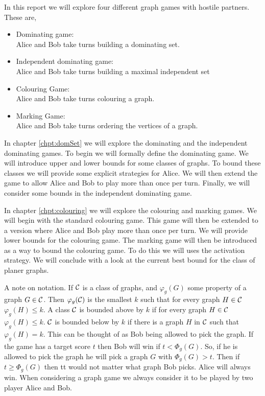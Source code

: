 In this report %
we will explore four different graph games with hostile partners. These are,
\begin{itemize}
    \item Dominating game: \\
        Alice and Bob take turns building a dominating set.
    \item Independent dominating game: \\
        Alice and Bob take turns building a maximal independent set    
    \item Colouring Game: \\
        Alice and Bob take turns colouring a graph.
    \item Marking Game: \\
        Alice and Bob take turns ordering the vertices of a graph.
\end{itemize}

In chapter \ref{chpt:domSet} we will explore the dominating and the independent dominating games. To begin we  will formally define the dominating game. We will introduce upper and lower bounds for some classes of graphs. To bound these classes we will provide some explicit strategies for Alice. We will then extend the game to allow Alice and Bob to play more than once per turn. Finally, we will consider some bounds in the independent dominating game.

In chapter \ref{chpt:colouring} we will explore the colouring and marking games. We will begin with the standard colouring game. This game will then be extended to a version where Alice and Bob play more than once per turn. We will provide lower bounds for the colouring game. The marking game will then be introduced as a way to bound the colouring game. To do this we will uses the activation strategy. We will conclude with a look at the current best bound for the class of planer graphs.




    
A note on notation. If $\mathcal{C}$ is a class of graphs, and $\varphi_g(G)$ some property of a graph $G \in \mathcal{C}$. Then $\varphi_g(\mathcal{C})$ is the smallest $k$ such that for every graph $H\in\mathcal{C}$ $\varphi_g(H)\leq k$. A class $\mathcal{C}$ is bounded above by $k$ if for every graph $H\in\mathcal{C}$ $\varphi_g(H)\leq k$. $\mathcal{C}$ is bounded below by $k$ if there is a graph $H$ in $\mathcal{C}$ such that $\varphi_g(H)= k$. This can be thought of as Bob being allowed to pick the graph. If the game has a target score $t$ then Bob will win if $t < \varPhi_g(G)$. So, if he is allowed to pick the graph he will pick a graph $G$ with $\varPhi_g(G) > t$. Then if $t\geq \varPhi_g(G)$ then tt would not matter what graph Bob picks. Alice will always win. When considering a graph game we always consider it to be played by two player Alice and Bob.  

